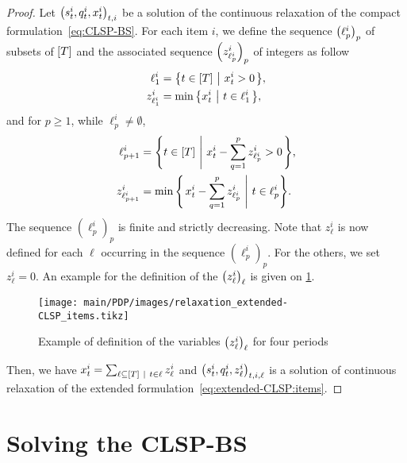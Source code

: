 \begin{proof}
Let $\bracket{\inventory_t^i, \quantity_t^i, \setup_t^i}_{t,i}$ be a solution of the continuous relaxation of the compact formulation~\eqref{eq:CLSP-BS}.
For each item $i$, we define the sequence $\bracket{\ell_p^i}_p$ of subsets of $\range{\horizon}$ and the associated sequence $\bracket{z_{\ell_p^i}^i}_p$ of integers as follow
\begin{equation}
  \begin{aligned}
  \ell_1^i       &= \crbracket{t\in\range{\horizon}~\left|~\setup_t^i>0\right.}, \\
  z_{\ell_1^i}^i &= \min\crbracket{\setup_t^i~\left|~t\in\ell_1^i\right.},
  \end{aligned}
\end{equation}
and for $p\ge1$, while $\ell_p^i\ne\emptyset$,
\begin{equation}
  \begin{aligned}
  \ell_{p+1}^i       &= \crbracket{t\in\range{\horizon}~\left|~\setup_t^i-\sum_{q=1}^p z_{\ell_p^i}^i>0\right.}, \\
  z_{\ell_{p+1}^i}^i &= \min\crbracket{\left.\setup_t^i-\sum_{q=1}^p z_{\ell_p^i}^i~\right|~t\in\ell_p^i}.
  \end{aligned}
\end{equation}
The sequence $(\ell_p^i)_p$ is finite and strictly decreasing.
Note that $z_{\ell}^i$ is now defined for each $\ell$ occurring in the sequence $(\ell_p^i)_p$.
For the others, we set $z_{\ell}^i=0$.
An example for the definition of the $\bracket{z_{\ell}^i}_{\ell}$ is given on \cref{fig:relaxation-extended-formulation-by-reference}.


\begin{figure}[h]
  \centering
  \texttt{[image: main/PDP/images/relaxation\_extended-CLSP\_items.tikz]}
  \caption{Example of definition of the variables $\bracket{z_{\ell}^i}_{\ell}$ for four periods}
  \label{fig:relaxation-extended-formulation-by-reference}
\end{figure}


Then, we have $\setup_t^i = \sum_{\ell\subseteq\range{\horizon}~|~t\in\ell} z_{\ell}^i$ and $\bracket{\inventory_t^i, \quantity_t^i, z_{\ell}^i}_{t,i,\ell}$ is a solution of continuous relaxation of the extended formulation~\eqref{eq:extended-CLSP:items}.
\end{proof}


\section{Solving the CLSP-BS}
\label{sec:PDP:deterministic:solving}


